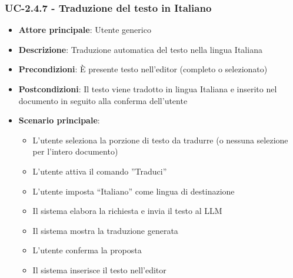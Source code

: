 \documentclass[11pt,a4paper]{article}
\begin{document}
\subsubsection{UC-2.4.7 - Traduzione del testo in Italiano}
\begin{itemize}
    \item \textbf{Attore principale}: Utente generico
    \item \textbf{Descrizione}: Traduzione automatica del testo nella lingua Italiana
    \item \textbf{Precondizioni}: È presente testo nell’editor (completo o selezionato)
    \item \textbf{Postcondizioni}: Il testo viene tradotto in lingua Italiana e inserito nel documento in seguito alla conferma dell'utente
    \item \textbf{Scenario principale}:
    \begin{itemize}
        \item L’utente seleziona la porzione di testo da tradurre (o nessuna selezione per l'intero documento)
        \item L’utente attiva il comando ”Traduci”
        \item L’utente imposta “Italiano” come lingua di destinazione
        \item Il sistema elabora la richiesta e invia il testo al LLM
        \item Il sistema mostra la traduzione generata
        \item L'utente conferma la proposta
        \item Il sistema inserisce il testo nell'editor
    \end{itemize}
\end{itemize}
\end{document}
